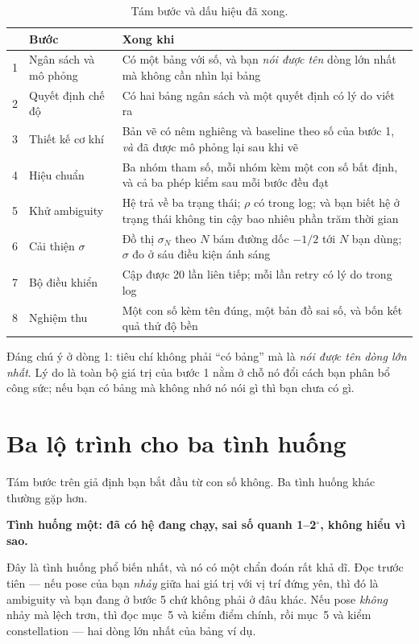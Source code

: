 \documentclass[../../marker.tex]{subfiles}
\begin{document}
\begin{table}[H]\centering\small
\caption{Tám bước và dấu hiệu đã xong.}
\label{tab:e19-xong}
\begin{tabularx}{\linewidth}{@{}L{0.5cm}L{3.4cm}Y@{}}
\toprule
& \textbf{Bước} & \textbf{Xong khi}\\
 & Ngân sách và mô phỏng & Có một bảng với số, và bạn \emph{nói được tên} dòng lớn nhất mà không cần nhìn lại bảng\\
2 & Quyết định chế độ & Có hai bảng ngân sách và một quyết định có lý do viết ra\\
3 & Thiết kế cơ khí & Bản vẽ có nêm nghiêng và baseline theo số của bước 1, \emph{và} đã được mô phỏng lại sau khi vẽ\\
4 & Hiệu chuẩn & Ba nhóm tham số, mỗi nhóm kèm một con số bất định, và cả ba phép kiểm sau mỗi bước đều đạt\\
5 & Khử ambiguity & Hệ trả về ba trạng thái; \(\rho\) có trong log; và bạn biết hệ ở trạng thái không tin cậy bao nhiêu phần trăm thời gian\\
6 & Cải thiện \(\sigma\) & Đồ thị \(\sigma_N\) theo \(N\) bám đường dốc \(-1/2\) tới \(N\) bạn dùng; \(\sigma\) đo ở sáu điều kiện ánh sáng\\
7 & Bộ điều khiển & Cập được 20 lần liên tiếp; mỗi lần retry có lý do trong log\\
8 & Nghiệm thu & Một con số kèm tên đúng, một bản đồ sai số, và bốn kết quả thử độ bền\\
\bottomrule
\end{tabularx}
\end{table}

Đáng chú ý ở dòng 1: tiêu chí không phải ``có bảng'' mà là \emph{nói được tên dòng lớn nhất}. Lý do là toàn bộ giá trị của bước 1 nằm ở chỗ nó đổi cách bạn phân bổ công sức; nếu bạn có bảng mà không nhớ nó nói gì thì bạn chưa có gì.

\section{Ba lộ trình cho ba tình huống}

Tám bước trên giả định bạn bắt đầu từ con số không. Ba tình huống khác thường gặp hơn.

\textbf{Tình huống một: đã có hệ đang chạy, sai số quanh 1--2\(^\circ\), không hiểu vì sao.}

Đây là tình huống phổ biến nhất, và nó có một chẩn đoán rất khả dĩ. Đọc  trước tiên --- nếu pose của bạn \emph{nhảy} giữa hai giá trị với vị trí đứng yên, thì đó là ambiguity và bạn đang ở bước 5 chứ không phải ở đâu khác. Nếu pose \emph{không} nhảy mà lệch trơn, thì đọc  mục~5 và kiểm điểm chính, rồi  mục~5 và kiểm constellation --- hai dòng lớn nhất của bảng ví dụ.
\end{document}
